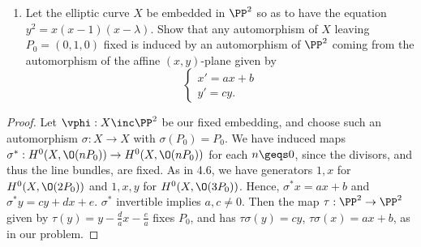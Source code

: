 \documentclass[12pt]{amsart}
\begin{document}
\begin{enumerate}
	\item[3.] {
      Let the elliptic curve $X$ be embedded in $\PP^2$ so as to have the equation $y^2=x(x-1)(x-\lambda)$.
      Show that any automorphism of $X$ leaving $P_0=(0,1,0)$ fixed is induced by an automorphism of $\PP^2$ coming from the automorphism of the affine $(x,y)$-plane given by 
      \[
        \begin{cases}
          x' = ax +b \\
          y' = cy.
        \end{cases}
      \] 
    }
\end{enumerate}

\begin{proof}
  Let $\vphi:X\inc \PP^2$ be our fixed embedding, and choose such an automorphism $\sigma:X\to X$ with $\sigma(P_0)=P_0$.
  We have induced maps $\sigma^*:H^0(X,\O(nP_0))\to H^0(X,\O(nP_0))$ for each $n\geqs 0$, since the divisors, and thus the line bundles, are fixed.
  As in 4.6, we have generators $1,x$ for $H^0(X,\O(2P_0))$ and $1,x,y$ for $H^0(X,\O(3P_0))$.
  Hence, $\sigma^*x=ax+b$ and $\sigma^*y=cy+dx+e$.
  $\sigma^*$ invertible implies $a,c\neq 0$.
  Then the map $\tau:\PP^2\to\PP^2$ given by $\tau(y)=y -\frac dax -\frac ea$ fixes $P_0$, and has $\tau\sigma(y)=cy$, $\tau\sigma(x)=ax+b$, as in our problem.%
\end{proof}

% 
\end{document}
